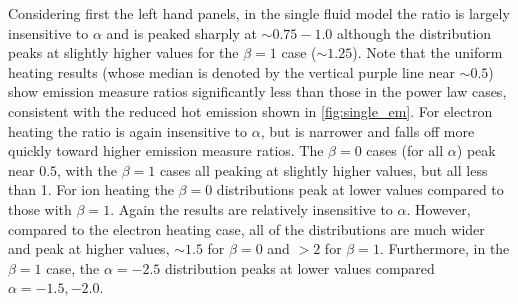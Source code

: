 \documentclass[preprint,linenumbers]{aastex}
\begin{document}
	\par Considering first the left hand panels, in the single fluid model the ratio is largely insensitive to $\alpha$ and is peaked sharply at $\sim0.75-1.0$ although the distribution peaks at slightly higher values for the $\beta=1$ case ($\sim1.25$). Note that the uniform heating results (whose median is denoted by the vertical purple line near $\sim0.5$) show emission measure ratios significantly less than those in the power law cases, consistent with the reduced hot emission shown in \autoref{fig:single_em}. For electron heating the ratio is again insensitive to $\alpha$, but is narrower and falls off more quickly toward higher emission measure ratios. The $\beta=0$ cases (for all $\alpha$) peak near $0.5$, with the $\beta=1$ cases all peaking at slightly higher values, but all less than 1. For ion heating the $\beta=0$ distributions peak at lower values compared to those with $\beta=1$. Again the results are relatively insensitive to $\alpha$. However, compared to the electron heating case, all of the distributions are much wider and peak at higher values, $\sim1.5$ for $\beta=0$ and $>2$ for $\beta=1$. Furthermore, in the $\beta=1$ case, the $\alpha=-2.5$ distribution peaks at lower values compared $\alpha=-1.5,-2.0$. 
\end{document}
